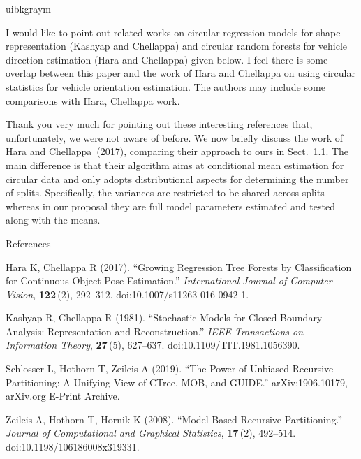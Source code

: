 \documentclass[english, noconfig]{uibklttr}
\newenvironment{re}{
    \begin{color}{uibkgraym}
        \itshape
}{
    \end{color}
}
\begin{document}
\vspace{0.5em}
\begin{re}
I would like to point out related works on circular regression models for
shape representation (Kashyap and Chellappa) and circular random forests for
vehicle direction estimation (Hara and Chellappa) given below. I feel there is
some overlap between this paper and the work of Hara and Chellappa on using
circular statistics for vehicle orientation estimation. The authors may include
some comparisons with Hara, Chellappa work.
\end{re}

Thank you very much for pointing out these interesting references that, unfortunately,
we were not aware of before. We now briefly discuss the work of Hara and Chellappa~(2017),
comparing their approach to ours in Sect.~1.1. The main difference is that their
algorithm aims at conditional mean estimation for circular data and only adopts
distributional aspects for determining the number of splits. Specifically, the
variances are restricted to be shared across splits whereas in our proposal they
are full model parameters estimated and tested along with the means.

\vspace{0.5cm}
References

Hara K, Chellappa R (2017). ``Growing Regression Tree Forests by
Classification for Continuous Object Pose Estimation.'' \emph{International
Journal of Computer Vision}, \textbf{122}\,(2), 292--312.
doi:10.1007/s11263-016-0942-1.

Kashyap R, Chellappa R (1981). ``Stochastic Models for Closed Boundary
Analysis: Representation and Reconstruction.'' \emph{IEEE Transactions on
Information Theory}, \textbf{27}\,(5), 627--637. doi:10.1109/TIT.1981.1056390.

Schlosser L, Hothorn T, Zeileis A (2019). ``The Power of Unbiased Recursive
Partitioning: A Unifying View of CTree, MOB, and GUIDE.'' arXiv:1906.10179,
arXiv.org E-Print Archive.

Zeileis A, Hothorn T, Hornik K (2008). ``Model-Based Recursive Partitioning.''
\emph{Journal of Computational and Graphical Statistics}, \textbf{17}\,(2),
492--514. doi:10.1198/106186008x319331.
\end{document}
